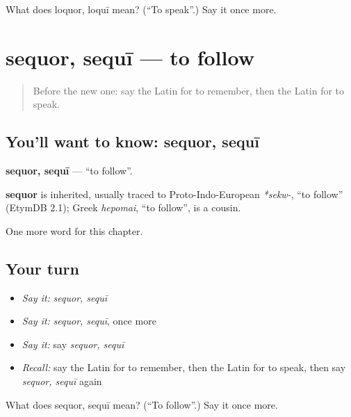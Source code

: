 \begin{tcolorbox}[breakable,colback=teal!4,colframe=teal!35!black,title={Before you move on}]
What does loquor, loquī mean? (\textquotedblleft{}To speak\textquotedblright{}.) Say it once more.
\end{tcolorbox}
\section[sequor, sequī]{sequor, sequī — to follow}

\label{lesson:LA-C235-sequor}



\begin{quote}
Before the new one: say the Latin for to remember, then the Latin for to speak.
\end{quote}

\subsection*{You'll want to know: sequor, sequī}
\textbf{sequor, sequī} — \textquotedblleft{}to follow\textquotedblright{}.

\begin{cousinweb}
\textbf{sequor} is inherited, usually traced to Proto-Indo-European \emph{*sekw-}, \textquotedblleft{}to follow\textquotedblright{} (EtymDB 2.1); Greek \emph{hepomai}, \textquotedblleft{}to follow\textquotedblright{}, is a cousin.
\end{cousinweb}

\begin{grammarlens}[title={What you've built}]
One more word for this chapter.
\end{grammarlens}

\subsection*{Your turn}
\begin{itemize}
\raggedright
  \item \emph{Say it:} \emph{sequor, sequī}
  \item \emph{Say it:} \emph{sequor, sequī}, once more
  \item \emph{Say it:} say \emph{sequor, sequī}
  \item \emph{Recall:} say the Latin for to remember, then the Latin for to speak, then say \emph{sequor, sequī} again
\end{itemize}

\begin{tcolorbox}[breakable,colback=teal!4,colframe=teal!35!black,title={Before you move on}]
What does sequor, sequī mean? (\textquotedblleft{}To follow\textquotedblright{}.) Say it once more.
\end{tcolorbox}
